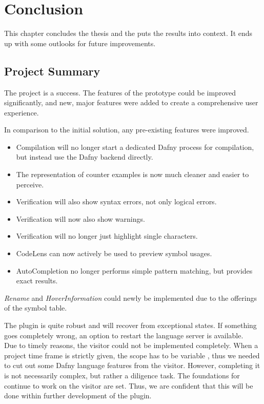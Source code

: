 \section{Conclusion}
\label{section:conclusion}
This chapter concludes the thesis and the puts the results into context.
It ends up with some outlooks for future improvements.

\subsection{Project Summary}
The project is a success.
The features of the prototype could be improved significantly, and new, major features were added to create a comprehensive user experience.

In comparison to the initial solution, any pre-existing features were improved.
\begin{itemize}
 \item Compilation will no longer start a dedicated Dafny process for compilation, but instead use the Dafny backend directly.
 \item The representation of counter examples is now much cleaner and easier to perceive.
 \item Verification will also show syntax errors, not only logical errors.
 \item Verification will now also show warnings.
 \item Verification will no longer just highlight single characters.
 \item CodeLens can now actively be used to preview symbol usages.
 \item AutoCompletion no longer performs simple pattern matching, but provides exact results.
\end{itemize}
\textit{Rename} and \textit{HoverInformation} could newly be implemented due to the offerings of the symbol table.

The plugin is quite robust and will recover from exceptional states.
If something goes completely wrong, an option to restart the language server is available.\\

Due to timely reasons, the visitor could not be implemented completely.
When a project time frame is strictly given, the scope has to be variable \cite{keller},
thus we needed to cut out some Dafny language features from the visitor.
However, completing it is not necessarily complex, but rather a diligence task.
The foundations for continue to work on the visitor are set.
Thus, we are confident that this will be done within further development of the plugin.\\

